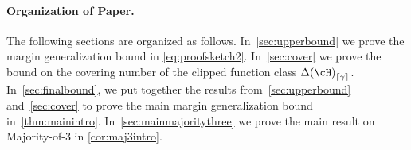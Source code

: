 \paragraph{Organization of Paper.}
The following sections are organized as follows. In~\cref{sec:upperbound} we prove the margin generalization bound in \cref{eq:proofsketch2}. In~\cref{sec:cover} we prove the bound on the covering number of the clipped function class $\dlh_{\left\lceil\gamma \right\rceil}$.  In~\cref{sec:finalbound}, we put together the results from~\cref{sec:upperbound} and~\cref{sec:cover} to prove the main margin generalization bound in~\cref{thm:mainintro}. In~\cref{sec:mainmajoritythree} we prove the main result on Majority-of-3 in \cref{cor:maj3intro}.  